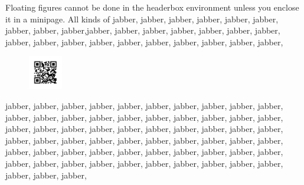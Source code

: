 \documentclass[landscape,final,a0paper,fontscale=0.285]{baposter}
\begin{document}
\begin{poster}
{\begin{minipage}{.9\linewidth}
    \raggedright
      Floating figures cannot be done in the headerbox environment unless you enclose it in a minipage.   All kinds of jabber, jabber, jabber, jabber, jabber, jabber, jabber, jabber, jabber,jabber, jabber, jabber,   jabber, jabber, jabber, jabber, jabber, jabber, jabber, 
   jabber, jabber, jabber, jabber, jabber, jabber, jabber, 
      \begin{figure}
    \vspace{-10pt}
    \includegraphics[height=4em]{images/priqr.png}
    \vspace{-10pt}
   \end{figure}
   jabber, jabber, jabber, jabber, jabber, jabber, jabber, 
   jabber, jabber, jabber, jabber, jabber, jabber, jabber, 
   jabber, jabber, jabber, jabber, jabber, jabber, jabber, 
   jabber, jabber, jabber, jabber, jabber, jabber, jabber, 
   jabber, jabber, jabber, jabber, jabber, jabber, jabber, 
   jabber, jabber, jabber, jabber, jabber, jabber, jabber, 
   jabber, jabber, jabber, jabber, jabber, jabber, jabber, 
   jabber, jabber, jabber, jabber, jabber, jabber, jabber, 
   jabber, jabber, jabber, jabber, jabber, jabber, jabber, 
  
   \end{minipage}
   
    }
    


\end{poster}
\end{document}
